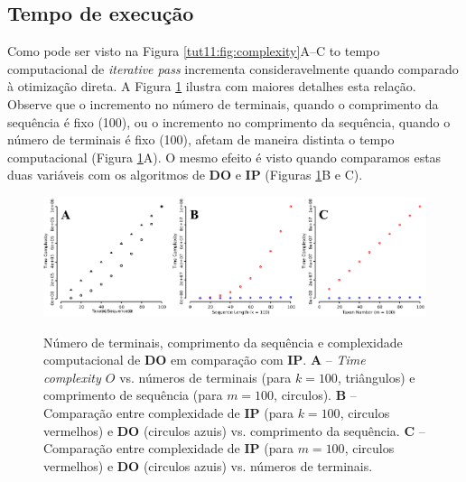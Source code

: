 \begin{refsection}
\subsection{Tempo de execução}\label{tut11:ip:time}

Como pode ser visto na Figura \ref{tut11:fig:complexity}A--C to tempo computacional de \textit{iterative pass} incrementa consideravelmente quando comparado à otimização direta. A Figura \ref{tut11:fig:complexity2} ilustra com maiores detalhes esta relação. Observe que o incremento no número de terminais, quando o comprimento da sequência é fixo (100), ou o incremento no comprimento da sequência, quando o número de terminais é fixo (100), afetam de maneira distinta o tempo computacional (Figura \ref{tut11:fig:complexity2}A). O mesmo efeito é visto quando comparamos estas duas variáveis com os algoritmos de \textbf{DO} e \textbf{IP} (Figuras \ref{tut11:fig:complexity2}B e C).

  \begin{figure}[H]
       \centering
      {\includegraphics[scale=0.9]{figures/tut11/complexity_2.eps}}
	{\caption[Número de terminais, comprimento da sequência e complexidade computacional de \textbf{DO} em comparação com \textbf{IP}.]{Número de terminais, comprimento da sequência e complexidade computacional de \textbf{DO} em comparação com \textbf{IP}. \textbf{A} --  \textit{Time complexity $O$} vs. números de terminais (para $k=100$, triângulos) e comprimento de sequência (para $m=100$, circulos). \textbf{B} -- Comparação entre complexidade de \textbf{IP} (para $k=100$, circulos vermelhos) e \textbf{DO} (circulos azuis) vs. comprimento da sequência. \textbf{C} -- Comparação entre complexidade de \textbf{IP} (para $m=100$, circulos vermelhos) e \textbf{DO} (circulos azuis) vs. números de terminais.}\label{tut11:fig:complexity2}}
  \end{figure}



\end{refsection}
